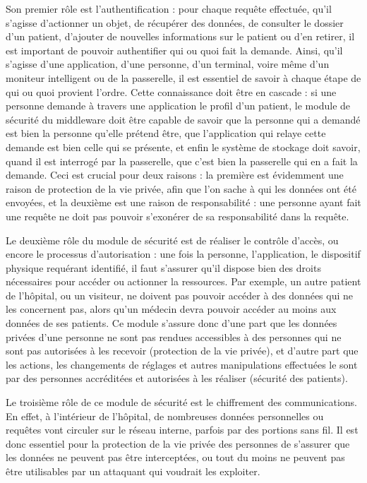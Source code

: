 Son premier rôle est l’authentification : pour chaque requête effectuée, qu’il s’agisse d’actionner un objet, de récupérer des données, de consulter le dossier d’un patient, d’ajouter de nouvelles informations sur le patient ou d’en retirer, il est important de pouvoir authentifier qui ou quoi fait la demande. Ainsi, qu’il s’agisse d’une application, d’une personne, d’un terminal, voire même d’un moniteur intelligent ou de la passerelle, il est essentiel de savoir à chaque étape de qui ou quoi provient l’ordre. Cette connaissance doit être en cascade : si une personne demande à travers une application le profil d’un patient, le module de sécurité du middleware doit être capable de savoir que la personne qui a demandé est bien la personne qu’elle prétend être, que l’application qui relaye cette demande est bien celle qui se présente, et enfin le système de stockage doit savoir, quand il est interrogé par la passerelle, que c’est bien la passerelle qui en a fait la demande. Ceci est crucial pour deux raisons : la première est évidemment une raison de protection de la vie privée, afin que l’on sache à qui les données ont été envoyées, et la deuxième est une raison de responsabilité : une personne ayant fait une requête ne doit pas pouvoir s’exonérer de sa responsabilité dans la requête.

Le deuxième rôle du module de sécurité est de réaliser le contrôle d’accès, ou encore le processus d’autorisation : une fois la personne, l’application, le dispositif physique requérant identifié, il faut s’assurer qu’il dispose bien des droits nécessaires pour accéder ou actionner la ressources. Par exemple, un autre patient de l’hôpital, ou un visiteur, ne doivent pas pouvoir accéder à des données qui ne les concernent pas, alors qu’un médecin devra pouvoir accéder au moins aux données de ses patients. Ce module s’assure donc d’une part que les données privées d’une personne ne sont pas rendues accessibles à des personnes qui ne sont pas autorisées à les recevoir (protection de la vie privée), et d’autre part que les actions, les changements de réglages et autres manipulations effectuées le sont par des personnes accréditées et autorisées à les réaliser (sécurité des patients).

Le troisième rôle de ce module de sécurité est le chiffrement des communications. En effet, à l’intérieur de l’hôpital, de nombreuses données personnelles ou requêtes vont circuler sur le réseau interne, parfois par des portions sans fil. Il est donc essentiel pour la protection de la vie privée des personnes de s’assurer que les données ne peuvent pas être interceptées, ou tout du moins ne peuvent pas être utilisables par un attaquant qui voudrait les exploiter.


